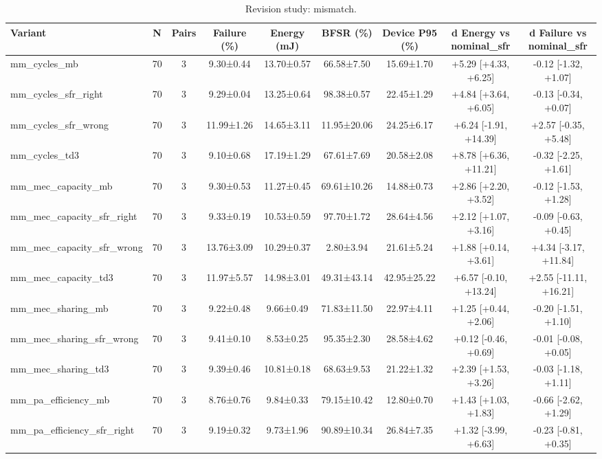 \begin{table}[t]
\centering
\caption{Revision study: mismatch.}
\label{tab:rev_mismatch}
\footnotesize
\setlength{\tabcolsep}{3pt}
\begin{tabular}{lcccccccc}
\hline
Variant & N & Pairs & Failure (\%) & Energy (mJ) & BFSR (\%) & Device P95 (\%) & d Energy vs nominal\_sfr & d Failure vs nominal\_sfr \\
\hline
mm\_cycles\_mb & 70 & 3 & 9.30±0.44 & 13.70±0.57 & 66.58±7.50 & 15.69±1.70 & +5.29 [+4.33, +6.25] & -0.12 [-1.32, +1.07] \\
mm\_cycles\_sfr\_right & 70 & 3 & 9.29±0.04 & 13.25±0.64 & 98.38±0.57 & 22.45±1.29 & +4.84 [+3.64, +6.05] & -0.13 [-0.34, +0.07] \\
mm\_cycles\_sfr\_wrong & 70 & 3 & 11.99±1.26 & 14.65±3.11 & 11.95±20.06 & 24.25±6.17 & +6.24 [-1.91, +14.39] & +2.57 [-0.35, +5.48] \\
mm\_cycles\_td3 & 70 & 3 & 9.10±0.68 & 17.19±1.29 & 67.61±7.69 & 20.58±2.08 & +8.78 [+6.36, +11.21] & -0.32 [-2.25, +1.61] \\
mm\_mec\_capacity\_mb & 70 & 3 & 9.30±0.53 & 11.27±0.45 & 69.61±10.26 & 14.88±0.73 & +2.86 [+2.20, +3.52] & -0.12 [-1.53, +1.28] \\
mm\_mec\_capacity\_sfr\_right & 70 & 3 & 9.33±0.19 & 10.53±0.59 & 97.70±1.72 & 28.64±4.56 & +2.12 [+1.07, +3.16] & -0.09 [-0.63, +0.45] \\
mm\_mec\_capacity\_sfr\_wrong & 70 & 3 & 13.76±3.09 & 10.29±0.37 & 2.80±3.94 & 21.61±5.24 & +1.88 [+0.14, +3.61] & +4.34 [-3.17, +11.84] \\
mm\_mec\_capacity\_td3 & 70 & 3 & 11.97±5.57 & 14.98±3.01 & 49.31±43.14 & 42.95±25.22 & +6.57 [-0.10, +13.24] & +2.55 [-11.11, +16.21] \\
mm\_mec\_sharing\_mb & 70 & 3 & 9.22±0.48 & 9.66±0.49 & 71.83±11.50 & 22.97±4.11 & +1.25 [+0.44, +2.06] & -0.20 [-1.51, +1.10] \\
mm\_mec\_sharing\_sfr\_wrong & 70 & 3 & 9.41±0.10 & 8.53±0.25 & 95.35±2.30 & 28.58±4.62 & +0.12 [-0.46, +0.69] & -0.01 [-0.08, +0.05] \\
mm\_mec\_sharing\_td3 & 70 & 3 & 9.39±0.46 & 10.81±0.18 & 68.63±9.53 & 21.22±1.32 & +2.39 [+1.53, +3.26] & -0.03 [-1.18, +1.11] \\
mm\_pa\_efficiency\_mb & 70 & 3 & 8.76±0.76 & 9.84±0.33 & 79.15±10.42 & 12.80±0.70 & +1.43 [+1.03, +1.83] & -0.66 [-2.62, +1.29] \\
mm\_pa\_efficiency\_sfr\_right & 70 & 3 & 9.19±0.32 & 9.73±1.96 & 90.89±10.34 & 26.84±7.35 & +1.32 [-3.99, +6.63] & -0.23 [-0.81, +0.35] \\

\end{tabular}
\end{table}
